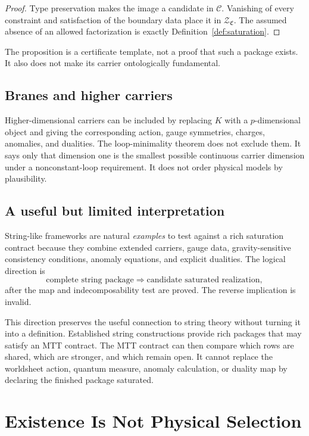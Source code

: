 \documentclass[11pt]{article}
\newcommand{\Contract}{\mathfrak C}
\newcommand{\Sol}{\mathcal Z}
\newcommand{\Cat}{\mathcal C}
\begin{document}
\begin{proof}
Type preservation makes the image a candidate in $\Cat$.  Vanishing of every
constraint and satisfaction of the boundary data place it in
$\Sol_{\Contract}$.  The assumed absence of an allowed factorization is exactly
Definition~\ref{def:saturation}.
\end{proof}

The proposition is a certificate template, not a proof that such a package
exists.  It also does not make its carrier ontologically fundamental.

\subsection{Branes and higher carriers}

Higher-dimensional carriers can be included by replacing $K$ with a
$p$-dimensional object and giving the corresponding action, gauge symmetries,
charges, anomalies, and dualities.  The loop-minimality theorem does not
exclude them.  It says only that dimension one is the smallest possible
continuous carrier dimension under a nonconstant-loop requirement.  It does
not order physical models by plausibility.

\subsection{A useful but limited interpretation}

String-like frameworks are natural \emph{examples} to test against a rich
saturation contract because they combine extended carriers, gauge data,
gravity-sensitive consistency conditions, anomaly equations, and explicit
dualities.  The logical direction is
\[
 \text{complete string package}
 \Longrightarrow
 \text{candidate saturated realization},
\]
after the map and indecomposability test are proved.  The reverse implication
is invalid.

This direction preserves the useful connection to string theory without
turning it into a definition.  Established string constructions provide rich
packages that may satisfy an MTT contract.  The MTT contract can then compare
which rows are shared, which are stronger, and which remain open.  It cannot
replace the worldsheet action, quantum measure, anomaly calculation, or
duality map by declaring the finished package saturated.

\section{Existence Is Not Physical Selection}
\end{document}
